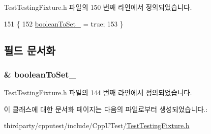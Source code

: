 Test\+Testing\+Fixture.\+h 파일의 150 번째 라인에서 정의되었습니다.


\begin{DoxyCode}
151     \{
152         \hyperlink{class_set_boolean_on_destructor_call_ab5003d5457b5d41b793621988f1510c2}{booleanToSet\_} = \textcolor{keyword}{true};
153     \}
\end{DoxyCode}


\subsection{필드 문서화}
\subsubsection[{\texorpdfstring{boolean\+To\+Set\+\_\+}{booleanToSet_}}]{\& boolean\+To\+Set\+\_\+\hspace{0.3cm}{\ttfamily [private]}}\hypertarget{class_set_boolean_on_destructor_call_ab5003d5457b5d41b793621988f1510c2}{}\label{class_set_boolean_on_destructor_call_ab5003d5457b5d41b793621988f1510c2}


Test\+Testing\+Fixture.\+h 파일의 144 번째 라인에서 정의되었습니다.



이 클래스에 대한 문서화 페이지는 다음의 파일로부터 생성되었습니다.\+:\begin{DoxyCompactItemize}
\item 
thirdparty/cpputest/include/\+Cpp\+U\+Test/\hyperlink{_test_testing_fixture_8h}{Test\+Testing\+Fixture.\+h}\end{DoxyCompactItemize}
